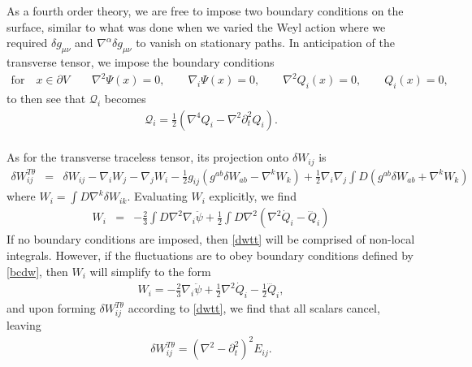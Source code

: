 \documentclass[10pt,letterpaper]{article}
\numberwithin{equation}{section}
\begin{document}
As a fourth order theory, we are free to impose two boundary conditions on the surface, similar to what was done when we varied the Weyl action where we required $\delta g_{\mu\nu}$ and $\nabla^\alpha \delta g_{\mu\nu}$ to vanish on stationary paths. In anticipation of the transverse tensor, we impose the boundary conditions
\begin{eqnarray}
\text{for}\quad x\in \partial V\qquad \nabla^2 \Psi(x) =0,\qquad
\nabla_i \Psi(x)=0,\qquad
\nabla^2 Q_i(x)=0,\qquad 
Q_i(x) =0,
\label{bcdw}
\end{eqnarray}
to then see that $\mathcal Q_i$ becomes
\begin{eqnarray}
\boxed{
\mathcal Q_i = \tfrac{1}{2}\left(\nabla^4 Q_i -  \nabla^2 \partial_t^2 Q_i \right)}.
\end{eqnarray}
\\ 
As for the transverse traceless tensor, its projection onto $\delta W_{ij}$ is
\begin{eqnarray}
\delta W_{ij}^{T\theta} &=& \delta W_{ij} - \nabla_i W_j - \nabla_j W_i - \frac12 g_{ij}(g^{ab}\delta W_{ab}-\nabla^k W_k) + \frac12 \nabla_i \nabla_j \int D(g^{ab}\delta W_{ab}+\nabla^k W_k)
\label{dwtt}
\end{eqnarray}
where $W_i = \int D\nabla^k\delta W_{ik}$. Evaluating $W_i$ explicitly, we find
\begin{eqnarray}
W_i &=& -\tfrac23 \int D \nabla^2\nabla_i \ddot\psi+\tfrac12 \int D\nabla^2(\nabla^2\dot{Q}_i-\dddot Q_i)
\end{eqnarray}
If no boundary conditions are imposed, then \eqref{dwtt} will be comprised of non-local integrals. However, if the fluctuations are to obey boundary conditions defined by \eqref{bcdw}, then $W_i$ will simplify to the form
\begin{eqnarray}
W_i = -\tfrac23 \nabla_i \ddot\psi + \tfrac12 \nabla^2\dot Q_i -\tfrac12 \dddot Q_i,
\end{eqnarray}
and upon forming $\delta W_{ij}^{T\theta}$ according to \eqref{dwtt}, we find that all scalars cancel, leaving 
\begin{eqnarray}
\boxed{
\delta W_{ij}^{T\theta} = (\nabla^2-\partial_t^2)^2E_{ij}}.
\end{eqnarray}
\end{document}
